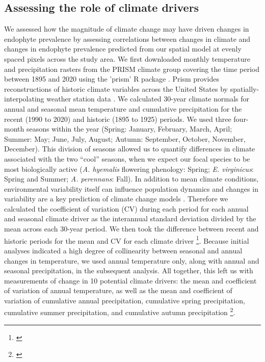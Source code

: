 \documentclass[11pt]{article}
\let\cite\citep
\newcommand{\tom}[2]{{\color{red}{#1}}\footnote{\textit{\color{red}{#2}}}}
\newcommand{\jacob}[2]{{\color{blue}{#1}}\footnote{\textit{\color{blue}{#2}}}}
\begin{document}
\subsection*{Assessing the role of climate drivers}
We assessed how the magnitude of climate change may have driven changes in endophyte prevalence by assessing correlations between changes in climate and changes in endophyte prevalence predicted from our spatial model at evenly spaced pixels across the study area.
We first downloaded monthly temperature and precipitation rasters from the PRISM climate group \citep{daly2013prism} covering the time period between 1895 and 2020 using the 'prism' R package \citep{Rprism2015}. 
Prism provides reconstructions of historic climate variables across the United States by spatially-interpolating weather station data \citep{diLuzio2008constructing}. 
We calculated 30-year climate normals for annual and seasonal mean temperature and cumulative precipitation for the recent (1990 to 2020) and historic (1895 to 1925) periods.
We used three four-month seasons within the year (Spring: January, February, March, April; Summer: May; June, July, August; Autumn: September, October, November, December). 
This division of seasons allowed us to quantify differences in climate associated with the two ``cool'' seasons, when we expect our focal species to be most biologically active (\emph{A. hyemalis} flowering phenology: Spring; \emph{E. virginicus}: Spring and Summer; \emph{A. perennans}: Fall). 
In addition to mean climate conditions, environmental variability itself can influence population dynamics \cite{tuljapurkar_population_1982} and changes in variability are a key prediction of climate change models \cite{stocker2013technical, ipcc_2021}.
Therefore we calculated the coefficient of variation (CV) during each period for each annual and seasonal climate driver as the interannual standard deviation divided by the mean across each 30-year period.
We then took the difference between recent and historic periods for the mean and CV for each climate driver \tom{(Fig. A5)}{This is Figure A7 -- Can you make the color scale on these diverging at zero?}.
Because initial analyses indicated a high degree of collinearity between seasonal and annual changes in temperature, we used annual temperature only, along with annual and seasonal precipitation, in the subsequent analysis.
All together, this left us with measurements of change in 10 potential climate drivers: the mean and coefficient of variation of annual temperature, as well as the mean and coefficient of variation of cumulative annual precipitation, cumulative spring precipitation, cumulative summer precipitation, and cumulative autumn precipitation \jacob{(Fig A8-A9)}{ The species names are not clear  on Fig A9. I suggest increase the font siize }.
\end{document}
